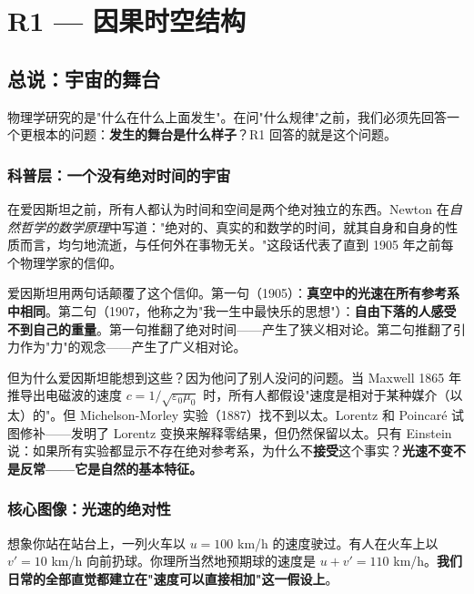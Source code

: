 \chapter{R1 — 因果时空结构}
\label{ch:r1}

\section{总说：宇宙的舞台}

物理学研究的是"什么在什么上面发生"。在问"什么规律"之前，我们必须先回答一个更根本的问题：\textbf{发生的舞台是什么样子}？R1 回答的就是这个问题。

\subsection{科普层：一个没有绝对时间的宇宙}

在爱因斯坦之前，所有人都认为时间和空间是两个绝对独立的东西。Newton 在\textit{自然哲学的数学原理}中写道："绝对的、真实的和数学的时间，就其自身和自身的性质而言，均匀地流逝，与任何外在事物无关。"这段话代表了直到 1905 年之前每个物理学家的信仰。

爱因斯坦用两句话颠覆了这个信仰。第一句（1905）：\textbf{真空中的光速在所有参考系中相同}。第二句（1907，他称之为"我一生中最快乐的思想"）：\textbf{自由下落的人感受不到自己的重量}。第一句推翻了绝对时间——产生了狭义相对论。第二句推翻了引力作为"力"的观念——产生了广义相对论。

但为什么爱因斯坦能想到这些？因为他问了别人没问的问题。当 Maxwell 1865 年推导出电磁波的速度 $c = 1/\sqrt{\varepsilon_0\mu_0}$ 时，所有人都假设"速度是相对于某种媒介（以太）的"。但 Michelson-Morley 实验（1887）找不到以太。Lorentz 和 Poincaré 试图修补——发明了 Lorentz 变换来解释零结果，但仍然保留以太。只有 Einstein 说：如果所有实验都显示不存在绝对参考系，为什么不\textbf{接受}这个事实？\textbf{光速不变不是反常——它是自然的基本特征。}

\subsection{核心图像：光速的绝对性}

想象你站在站台上，一列火车以 $u = 100$ km/h 的速度驶过。有人在火车上以 $v' = 10$ km/h 向前扔球。你理所当然地预期球的速度是 $u + v' = 110$ km/h。\textbf{我们日常的全部直觉都建立在"速度可以直接相加"这一假设上}。

